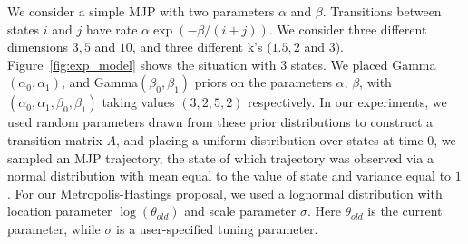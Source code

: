 \noindent We consider a simple MJP with two parameters $\alpha$ and $\beta$. Transitions between states $i$ and $j$ have rate $\alpha \exp(-\beta/(i+j))$.
We consider three different dimensions $3, 5$ and $10$, and three different k's ($1.5, 2$ and $3$). 
Figure~\ref{fig:exp_model} shows the situation with $3$ states.  
We placed Gamma$(\alpha_0,\alpha_1)$, and Gamma$(\beta_0, \beta_1)$ priors on the parameters $\alpha$, $\beta$, with $(\alpha_0,\alpha_1,\beta_0,\beta_1)$ taking
values $(3,2,5,2)$ respectively. In our experiments, we used random parameters drawn from these prior distributions to construct a transition matrix $A$,
and placing a uniform distribution over states at time $0$, we sampled an MJP trajectory,
the state of which trajectory was observed via a normal distribution with mean equal to the value of state and variance equal to $1$.
For our Metropolis-Hastings proposal, we used a lognormal distribution with location parameter $\log(\theta_{old})$ and scale parameter $\sigma$. Here
$\theta_{old}$ is the current parameter, while $\sigma$ is a user-specified tuning parameter.
